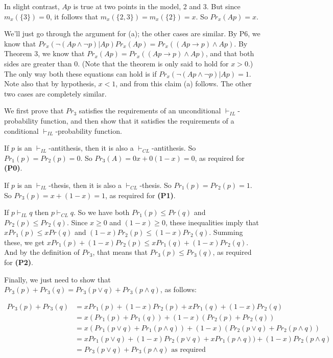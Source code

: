 In slight contrast, $Ap$ is true at two points in the model, 2 and 3. But since $m_x(\{3\}) = 0$, it follows that $m_x(\{2, 3\}) = m_x(\{2\}) = x$. So  $Pr_x(Ap) = x$.

\TheoremFour

\noindent We'll just go through the argument for (a); the other cases are similar. By P6, we know that $Pr_x(\neg(Ap \wedge \neg p) | Ap) Pr_x(Ap) = Pr_x((Ap \rightarrow p) \wedge Ap)$. By Theorem 3, we know that $Pr_x(Ap) = Pr_x((Ap \rightarrow p) \wedge Ap)$, and that both sides are greater than 0. (Note that the theorem is only said to hold for $x > 0$.) The only way both these equations can hold is if $Pr_x(\neg(Ap \wedge \neg p) | Ap) = 1$. Note also that by hypothesis, $x < 1$, and from this claim (a) follows. The other two cases are completely similar.

\TheoremFive

\noindent We first prove that $Pr_3$ satisfies the requirements of an unconditional $\vdash_{IL}$-probability function, and then show that it satisfies the requirements of a conditional $\vdash_{IL}$\hyp{}probability function.

If $p$ is an $\vdash_{IL}$-antithesis, then it is also a $\vdash_{CL}$-antithesis. So $Pr_1(p) = Pr_2(p) = 0$. So $Pr_3(A) = 0x + 0(1-x) = 0$, as required for \textbf{(P0)}.

If $p$ is an $\vdash_{IL}$-thesis, then it is also a $\vdash_{CL}$-thesis. So $Pr_1(p) = Pr_2(p) = 1$. So $Pr_3(p) = x + (1-x) = 1$, as required for \textbf{(P1)}.

If $p \vdash_{IL} q$ then $p \vdash_{CL} q$. So we have both $Pr_1(p) \leq Pr(q)$ and $Pr_2(p) \leq Pr_2(q)$. Since $x \geq 0$ and $(1-x) \geq 0$, these inequalities imply that  $xPr_1(p) \leq xPr(q)$ and $(1-x)Pr_2(p) \leq (1-x)Pr_2(q)$. Summing these, we get $xPr_1(p) + (1-x)Pr_2(p) \leq xPr_1(q) + (1-x)Pr_2(q)$. And by the definition of $Pr_3$, that means that $Pr_3(p) \leq Pr_3(q)$, as required for \textbf{(P2)}.

Finally, we just need to show that $Pr_3(p) + Pr_3(q) = Pr_3(p \vee q) + Pr_3(p \wedge q)$, as follows:

\begin{align}
Pr_3(p) + Pr_3(q) &= xPr_1(p) + (1-x)Pr_2(p) + xPr_1(q) + (1-x)Pr_2(q) \\
 &= x(Pr_1(p) + Pr_1(q)) + (1-x)(Pr_2(p) + Pr_2(q)) \\
 &= x(Pr_1(p \vee q) + Pr_1(p \wedge q)) + (1-x)(Pr_2(p \vee q) + Pr_2(p \wedge q)) \\
 &= xPr_1(p \vee q) + (1-x)Pr_2(p \vee q) + xPr_1(p \wedge q)) + (1-x)Pr_2(p \wedge q) \\
 &= Pr_3(p \vee q) + Pr_3(p \wedge q) \text{ as required}
\end{align}

